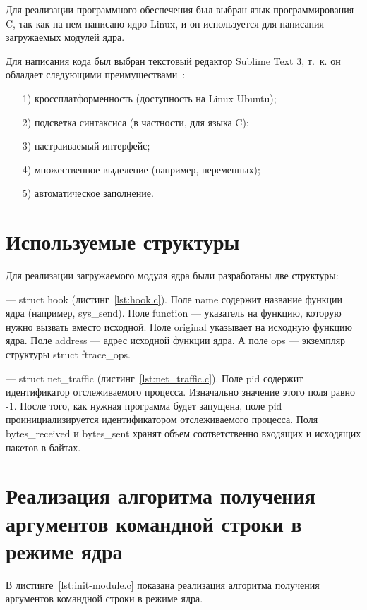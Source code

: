 \documentclass{bmstu}
\begin{document}
Для реализации программного обеспечения был выбран язык программирования C, так как на нем написано ядро Linux, и он используется для написания загружаемых модулей ядра.

Для написания кода был выбран текстовый редактор Sublime Text 3, т.~к. он обладает следующими преимуществами~\cite{SublimeText}:
\begin{enumerate}
\item[1)] кроссплатформенность (доступность на Linux Ubuntu);
\item[2)] подсветка синтаксиса (в частности, для языка C);
\item[3)] настраиваемый интерфейс;
\item[4)] множественное выделение (например, переменных);
\item[5)] автоматическое заполнение.
\end{enumerate}

\section{Используемые структуры}

Для реализации загружаемого модуля ядра были разработаны две структуры:

--- struct hook (листинг~\ref{lst:hook.c}). 
Поле name содержит название функции ядра (например, sys\_send). 
Поле function --- указатель на функцию, которую нужно вызвать вместо исходной. 
Поле original указывает на исходную функцию ядра. 
Поле address --- адрес исходной функции ядра. 
А поле ops --- экземпляр структуры struct ftrace\_ops.


--- struct net\_traffic (листинг~\ref{lst:net_traffic.c}). 
Поле pid содержит идентификатор отслеживаемого процесса. 
Изначально значение этого поля равно -1. 
После того, как нужная программа будет запущена, поле pid проинициализируется идентификатором отслеживаемого процесса. 
Поля bytes\_received и bytes\_sent хранят объем соответственно входящих и исходящих пакетов в байтах.


\section{Реализация алгоритма получения аргументов командной строки в режиме ядра}

В листинге~\ref{lst:init-module.c} показана реализация алгоритма получения аргументов командной строки в режиме ядра.
\end{document}
